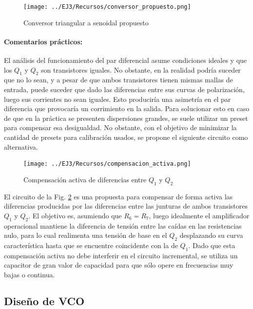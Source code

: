 \begin{figure}[H]
    \centering
    \texttt{[image: ../EJ3/Recursos/conversor\_propuesto.png]}
    \caption{Conversor triangular a senoidal propuesto}
    \label{fig:circuito_conversor_propuesto}
\end{figure}

\paragraph{Comentarios pr\'acticos:} El an\'alisis del funcionamiento del par diferencial asume condiciones ideales y que los $Q_1$ y $Q_2$ son transistores iguales. No obstante,
en la realidad podr\'ia suceder que no lo sean, y a pesar de que ambos transistores tienen mismas mallas de entrada, puede suceder que dado las diferencias entre sus curvas de polarizaci\'on,
luego sus corrientes no sean iguales. Esto producir\'ia una asimetr\'ia en el par diferencia que provocar\'ia un corrimiento en la salida. Para solucionar esto en caso de que en la pr\'actica se presenten
dispersiones grandes, se suele utilizar un preset para compensar esa desigualdad. No obstante, con el objetivo de minimizar la cantidad de presets para calibraci\'on usados, se propone el siguiente circuito
como alternativa.

\begin{figure}[H]
    \centering
    \texttt{[image: ../EJ3/Recursos/compensacion\_activa.png]}
    \caption{Compensaci\'on activa de diferencias entre $Q_1$ y $Q_2$}
    \label{fig:compensacion_activa}
\end{figure}

El circuito de la Fig. \ref{fig:compensacion_activa} es una propuesta para compensar de forma activa las diferencias producidas por las diferencias
entre las junturas de ambos transistores $Q_1$ y $Q_2$. El objetivo es, asumiendo que $R_6 = R_7$, luego idealmente el amplificador operacional mantiene la diferencia
de tensi\'on entre las ca\'idas en las resistencias nulo, para lo cual realimenta una tensi\'on de base en el $Q_2$ desplazando su curva caracter\'istica hasta que se encuentre
coincidente con la de $Q_1$. Dado que esta compensaci\'on activa no debe interferir en el circuito incremental, se utiliza un capacitor de gran valor de capacidad para que s\'olo
opere en frecuencias muy bajas o continua.

\subsection{Dise\~no de VCO}

